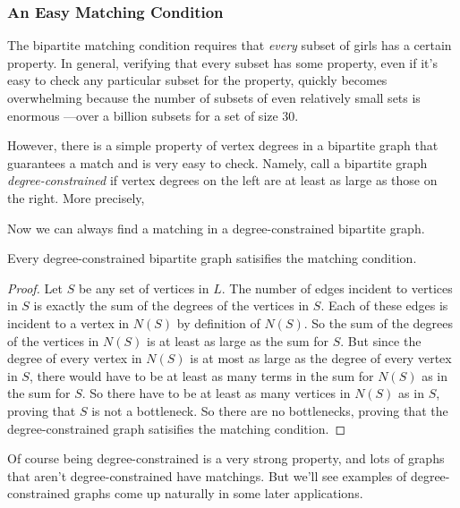 \subsubsection{An Easy Matching Condition}

The bipartite matching condition requires that \emph{every} subset of
girls has a certain property.  In general, verifying that every subset has
some property, even if it's easy to check any particular subset for the
property, quickly becomes overwhelming because the number of subsets of
even relatively small sets is enormous ---over a billion subsets for a set
of size 30.

However, there is a simple property of vertex degrees in a bipartite graph
that guarantees a match and is very easy to check.  Namely, call a
bipartite graph \emph{degree-constrained} if vertex degrees on the left
are at least as large as those on the right.  More precisely,


Now we can always find a matching in a degree-constrained bipartite graph.

\begin{lemma}
Every degree-constrained bipartite graph satisifies the matching condition.
\end{lemma}

\begin{proof}
Let $S$ be any set of vertices in $L$.  The number of edges incident to
vertices in $S$ is exactly the sum of the degrees of the vertices in $S$.
Each of these edges is incident to a vertex in $N(S)$ by definition of
$N(S)$.  So the sum of the degrees of the vertices in $N(S)$ is at least
as large as the sum for $S$.  But since the degree of every vertex in
$N(S)$ is at most as large as the degree of every vertex in $S$, there
would have to be at least as many terms in the sum for $N(S)$ as in the
sum for $S$.  So there have to be at least as many vertices in $N(S)$ as
in $S$, proving that $S$ is not a bottleneck.  So there are no
bottlenecks, proving that the degree-constrained graph satisifies the
matching condition.
\end{proof}

Of course being degree-constrained is a very strong property, and lots of
graphs that aren't degree-constrained have matchings.  But we'll see
examples of degree-constrained graphs come up naturally in some later
applications.

